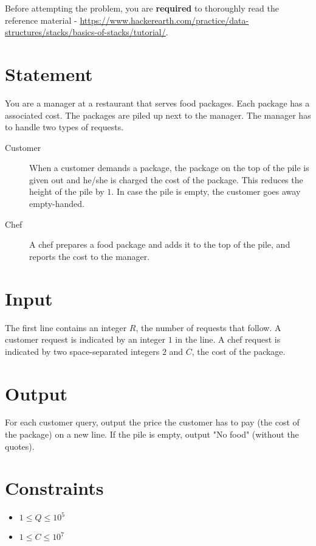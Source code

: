 \documentclass{article}
\begin{document}
Before attempting the problem, you are \textbf{required} to thoroughly read the reference material - \url{https://www.hackerearth.com/practice/data-structures/stacks/basics-of-stacks/tutorial/}.

\section*{Statement}

You are a manager at a restaurant that serves food packages. Each package has a associated cost. The packages are piled up next to the manager. The manager has to handle two types of requests.

\begin{description}
    \item[Customer] When a customer demands a package, the package on the top of the pile is given out and he/she is charged the cost of the package. This reduces the height of the pile by $1$. In case the pile is empty, the customer goes away empty-handed.
    
    \item[Chef] A chef prepares a food package and adds it to the top of the pile, and reports the cost to the manager.
\end{description}

\section*{Input}

The first line contains an integer $R$, the number of requests that follow. A customer request is indicated by an integer $1$ in the line. A chef request is indicated by two space-separated integers $2$ and $C$, the cost of the package.

\section*{Output}

For each customer query, output the price the customer has to pay (the cost of the package) on a new line. If the pile is empty, output "No food" (without the quotes).

\section*{Constraints}

\begin{itemize}
    \item $1 \le Q \le 10^{5}$
    \item $1 \le C \le 10^{7}$
\end{itemize}
\end{document}
